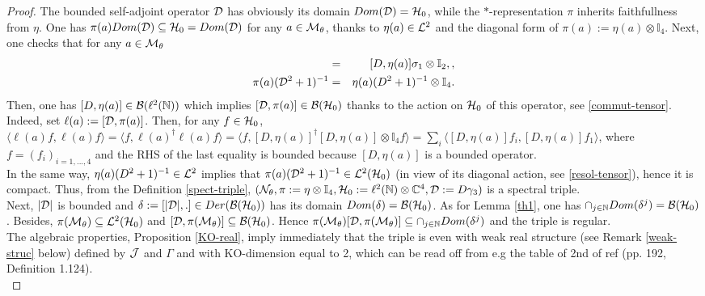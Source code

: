 \documentclass[a4paper,11pt,twoside]{article}
\numberwithin{equation}{section}
\newcommand\bbone{{ \mathbb{I}}}
\theoremstyle{nonumberplain}
\newtheorem{proof}{Proof}
\begin{document}
\begin{proof}
The bounded self-adjoint operator ${\cal{D}}$ has obviously its domain $Dom({\cal{D}})={\cal{H}}_0$, while the $*$-representation $\pi$ inherits faithfullness from $\eta$. One has $\pi(a)Dom({\cal{D}})\subseteq {\cal{H}}_0=Dom({\cal{D}})$ for any $a\in{\cal{M}}_\theta$, thanks to $\eta(a)\in{\cal{L}}^2$ and the diagonal form of $\pi(a):=\eta(a)\otimes\bbone_4$. Next, one checks that for any $a\in{\cal{M}}_\theta$
\begin{eqnarray}
[{\cal{D}},\pi(a)]&=&[D,\eta(a)]\sigma_1\otimes\bbone_2,\label{commut-tensor},\\
\pi(a)({\cal{D}}^2+1)^{-1}&=&\eta(a)(D^2+1)^{-1}\otimes\bbone_4\label{resol-tensor}.
\end{eqnarray}
Then, one has $[D,\eta(a)]\in{\cal{B}}(\ell^2(\mathbb{N}))$ which implies $[{\cal{D}},\pi(a)]\in{\cal{B}}({\cal{H}}_0)$ thanks to the action on ${\cal{H}}_0$ of this operator, see \eqref{commut-tensor}. Indeed, set $\ell(a):=[{\cal{D}},\pi(a)]$. Then, for any $f\in{\cal{H}}_0$, $\langle \ell(a)f ,\ell(a)f \rangle=\langle f ,\ell(a)^\dag\ell(a)f \rangle=\langle f ,[D,\eta(a)]^\dag[D,\eta(a)]\otimes\bbone_4f \rangle=\sum_i\langle [D,\eta(a)]f_i , [D,\eta(a)]f_1\rangle$, where $f=(f_i)_{i=1,...,4}$ and the RHS of the last equality is bounded because $[D,\eta(a)]$ is a bounded operator. \\
In the same way, $\eta(a)(D^2+1)^{-1}\in{\cal{L}}^2$ implies that $\pi(a)({\cal{D}}^2+1)^{-1}\in{\cal{L}}^2({\cal{H}}_0)$ (in view of its diagonal action, see \eqref{resol-tensor}), hence it is compact. Thus, from the Definition \ref{spect-triple}, $({\cal{N}}_\theta,\pi:=\eta\otimes\bbone_4,{\cal{H}}_0:=\ell^2(\mathbb{N})\otimes\mathbb{C}^4,{\cal{D}}:=D\gamma_3)$ is a spectral triple.\\
Next, $|{\cal{D}}|$ is bounded and $\delta:=[|{\cal{D}}|,.]\in Der({\cal{B}}({\cal{H}}_0))$ has its domain $Dom(\delta)={\cal{B}}({\cal{H}}_0)$. As for Lemma \ref{th1}, one has $\cap_{j\in\mathbb{N}}Dom(\delta^j) ={\cal{B}}({\cal{H}}_0)$. Besides, $\pi({\cal{M}}_\theta)\subseteq{\cal{L}}^2({\cal{H}}_0)$ and $[{\cal{D}},\pi({\cal{M}}_\theta)]\subseteq{\cal{B}}({\cal{H}}_0)$. Hence $\pi({\cal{M}}_\theta)[{\cal{D}},\pi({\cal{M}}_\theta)]\subseteq\cap_{j\in\mathbb{N}}Dom(\delta^j)$ and the triple is regular.\\
The algebraic properties, Proposition \ref{KO-real}, imply immediately that the triple is even with weak real structure (see Remark \ref{weak-struc} below) defined by ${\cal{J}}$ and $\Gamma$ and with KO-dimension equal to 2, which can be read off from e.g the table of 2nd of ref \cite{Connes1} (pp. 192, Definition 1.124).\\

\end{proof}
\end{document}
